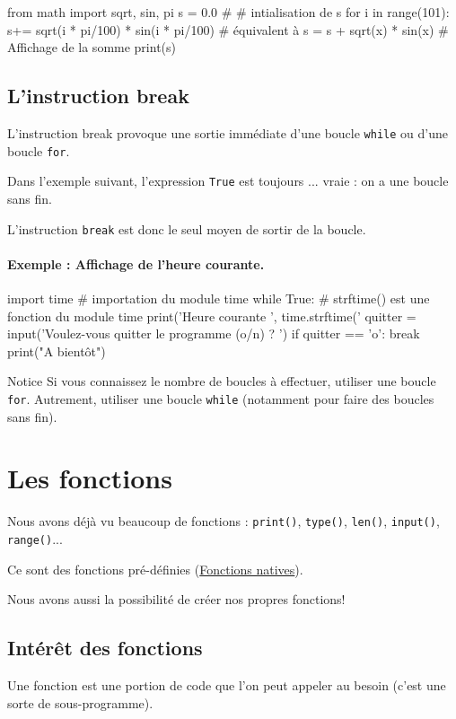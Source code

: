 \documentclass[%
oneside,                 %
final,                   %
10pt]{article}
\begin{document}
\bpycod
from math import sqrt, sin, pi
s = 0.0 # # intialisation de s
for i in range(101):
    s+= sqrt(i * pi/100) * sin(i * pi/100)   # équivalent à s = s + sqrt(x) * sin(x)
# Affichage de la somme
print(s)
\epycod
\subsection{L'instruction break}

L'instruction break provoque une sortie immédiate d'une boucle \texttt{while} ou d'une boucle \texttt{for}.

Dans l'exemple suivant, l'expression \texttt{True} est toujours ... vraie : on a une boucle sans fin.

L'instruction \texttt{break} est donc le seul moyen de sortir de la boucle.
\paragraph{Exemple : Affichage de l'heure courante.}
\bpycod
import time     # importation du module time
while True:
    # strftime() est une fonction du module time
    print('Heure courante ', time.strftime('%
    quitter = input('Voulez-vous quitter le programme (o/n) ? ')
    if quitter == 'o':
        break
print("A bientôt")
\epycod

\begin{block}{Notice}
Si vous connaissez le nombre de boucles à effectuer, utiliser une boucle \texttt{for}.
Autrement, utiliser une boucle \texttt{while} (notamment pour faire des boucles sans fin).
\end{block}
\section{Les fonctions}

Nous avons déjà vu beaucoup de fonctions : \texttt{print()}, \texttt{type()}, \texttt{len()}, \texttt{input()}, \texttt{range()}...

Ce sont des fonctions pré-définies (\href{{https://docs.python.org/fr/3/library/functions.html}}{Fonctions natives}).

Nous avons aussi la possibilité de créer nos propres fonctions!

\subsection{Intérêt des fonctions}

Une fonction est une portion de code que l'on peut appeler au besoin (c'est une sorte de sous-programme).
\end{document}
